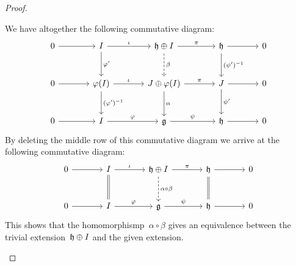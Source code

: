 \begin{proof}
\begin{implicationlist}
      We have altogether the following commutative diagram:
      \[
        \begin{tikzcd}[sep = large]
          0
          \arrow{r}
          &
          I
          \arrow{r}[above]{\iota}
          \arrow{d}[right]{\varphi'}
          &
          \hlie \oplus I
          \arrow{r}[above]{\pi}
          \arrow[dashed]{d}[right]{\beta}
          &
          \hlie
          \arrow{r}
          \arrow{d}[right]{(\psi')^{-1}}
          &
          0
          \\
          0
          \arrow{r}
          &
          \varphi(I)
          \arrow{r}[above]{\iota}
          \arrow{d}[right]{(\varphi')^{-1}}
          &
          J \oplus \varphi(I)
          \arrow{r}[above]{\pi}
          \arrow{d}[right]{\alpha}
          &
          J
          \arrow{r}
          \arrow{d}[right]{\psi'}
          &
          0
          \\
          0
          \arrow{r}
          &
          I
          \arrow{r}[above]{\varphi}
          &
          \glie
          \arrow{r}[above]{\psi}
          &
          \hlie
          \arrow{r}
          &
          0
        \end{tikzcd}
      \]
      By deleting the middle row of this commutative diagram we arrive at the following commutative diagram:
      \[
        \begin{tikzcd}[sep = large]
          0
          \arrow{r}
          &
          I
          \arrow{r}[above]{\iota}
          \arrow[equal]{d}
          &
          \hlie \oplus I
          \arrow{r}[above]{\pi}
          \arrow[dashed]{d}[right]{\alpha \circ \beta}
          &
          \hlie
          \arrow{r}
          \arrow[equal]{d}
          &
          0
          \\
          0
          \arrow{r}
          &
          I
          \arrow{r}[above]{\varphi}
          &
          \glie
          \arrow{r}[above]{\psi}
          &
          \hlie
          \arrow{r}
          &
          0
        \end{tikzcd}
      \]
      This shows that the homomorphismp~$\alpha \circ \beta$ gives an equivalence between the trivial extension~$\mathfrak{h} \oplus I$ and the given extension.
    \qedhere
  \end{implicationlist}
\end{proof}

